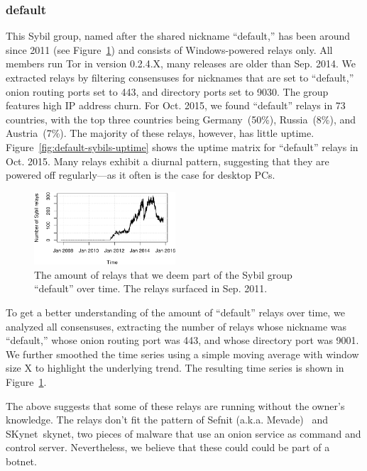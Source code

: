 \subsubsection{default}
This Sybil group, named after the shared nickname ``default,'' has been around
since 2011 (see Figure~\ref{fig:default-over-time}) and consists of
Windows-powered relays only.  All members run Tor in version 0.2.4.X, many
releases are older than Sep. 2014.  We extracted relays by filtering consensuses
for nicknames that are set to ``default,'' onion routing ports set to 443, and
directory ports set to 9030.  The group features high IP address churn.  For
Oct. 2015, we found ``default'' relays in 73 countries, with the top three
countries being Germany~(50\%), Russia~(8\%), and Austria~(7\%).  The majority
of these relays, however, has little uptime.
Figure~\ref{fig:default-sybils-uptime} shows the uptime matrix for ``default''
relays in Oct. 2015.  Many relays exhibit a diurnal pattern, suggesting
that they are powered off regularly---as it often is the case for desktop PCs.

\begin{figure}[t]
	\centering
	\includegraphics[width=0.47\textwidth]{diagrams/default-over-time}
	\caption{The amount of relays that we deem part of the Sybil group
	``default'' over time.  The relays surfaced in Sep. 2011.}
	\label{fig:default-over-time}
\end{figure}

To get a better understanding of the amount of ``default'' relays over time, we
analyzed all consensuses, extracting the number of relays whose nickname was
``default,'' whose onion routing port was 443, and whose directory port was
9001.  We further smoothed the time series using a simple moving average with
window size X to highlight the underlying trend.  The resulting time series is
shown in Figure~\ref{fig:default-over-time}.

The above suggests that some of these relays are running without the owner's
knowledge.  The relays don't fit the pattern of Sefnit (a.k.a.
Mevade)~\cite{sefnit} and SKynet~{skynet}, two pieces of malware that use an
onion service as command and control server.  Nevertheless, we believe that
these could could be part of a botnet.

